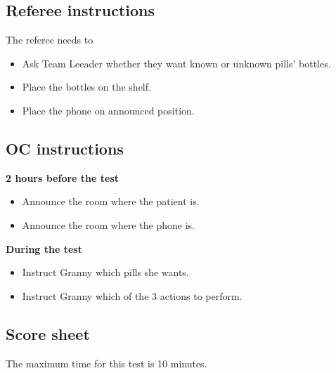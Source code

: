 \subsection{Referee instructions}

The referee needs to
\begin{itemize}
\item Ask Team Leeader whether they want known or unknown pills' bottles.
\item Place the bottles on the shelf.
\item Place the phone on announced position.
\end{itemize}

\subsection{OC instructions}

\textbf{2 hours before the test}
\begin{itemize}
	\item Announce the room where the patient is.
	\item Announce the room where the phone is.
\end{itemize}

\textbf{During the test}
\begin{itemize}
	\item Instruct Granny which pills she wants.
	\item Instruct Granny which of the 3 actions to perform.
\end{itemize}

\newpage 
\subsection{Score sheet}

The maximum time for this test is 10 minutes.

